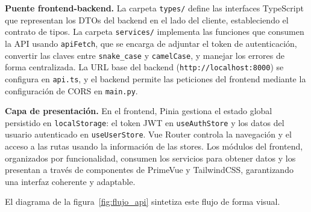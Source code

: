 \textbf{Puente frontend-backend.} La carpeta \texttt{types/} define las interfaces 
TypeScript que representan los DTOs del backend en el lado del cliente, estableciendo 
el contrato de tipos. La carpeta \texttt{services/} implementa las funciones que 
consumen la API usando \texttt{apiFetch}, que se encarga de adjuntar el token de 
autenticación, convertir las claves entre \texttt{snake\_case} y \texttt{camelCase}, 
y manejar los errores de forma centralizada. La URL base del backend 
(\texttt{http://localhost:8000}) se configura en \texttt{api.ts}, y el backend 
permite las peticiones del frontend mediante la configuración de CORS en 
\texttt{main.py}.

\textbf{Capa de presentación.} En el frontend, Pinia gestiona el estado global 
persistido en \texttt{localStorage}: el token JWT en \texttt{useAuthStore} y los 
datos del usuario autenticado en \texttt{useUserStore}. Vue Router controla la 
navegación y el acceso a las rutas usando la información de las stores. Los módulos 
del frontend, organizados por funcionalidad, consumen los servicios para obtener 
datos y los presentan a través de componentes de PrimeVue y TailwindCSS, garantizando 
una interfaz coherente y adaptable.

El diagrama de la figura~\ref{fig:flujo_api} sintetiza este flujo de forma visual.

